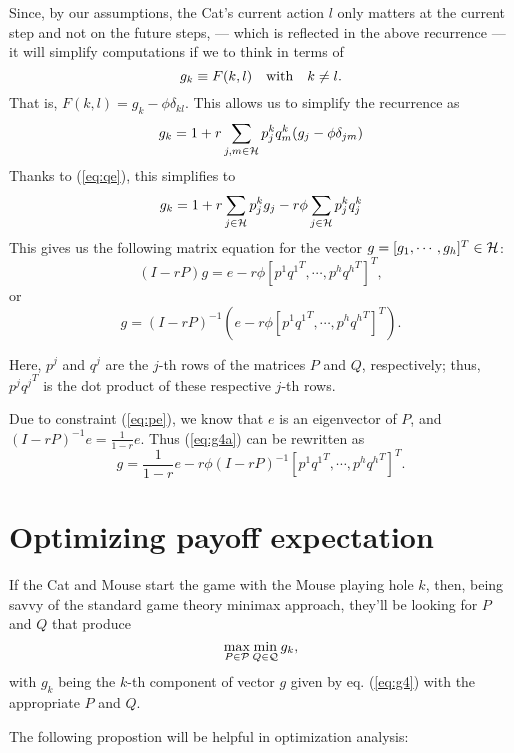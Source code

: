 \documentclass[12pt]{article}
\begin{document}
Since, by our assumptions, the Cat's current action $l$ only matters at the current step and not on the future steps, --- which is reflected in the above recurrence --- it will simplify computations if we to think in terms of 
$$
g_k \equiv F(k, l)  \quad {\rm with} \quad k\ne l.
$$
That is, $F(k,l) = g_k - \phi \delta_{kl}$.  This allows us to simplify the recurrence as
$$
g_k = 1  + r \sum_{j,m \in \cal{H}} p^k_j q^k_m  (g_j - \phi\delta_{jm})
$$
Thanks to (\ref{eq:qe}), this simplifies to
\begin{equation}
\label{eq:g2}
g_k = 1  + r \sum_{j\in \cal{H}} p^k_j g_j -  
r \phi \sum_{j\in \cal{H}}p^k_j q^k_j
\end{equation}
This gives us the following matrix equation for the vector
$g = [g_1, \cdots, g_h]^T \in \cal{H}$:
\begin{equation}
\label{eq:g3}
(I - rP) g = e - r \phi [ p^1 {q^1}^T, \cdots, p^h {q^h}^T]^T,
\end{equation}
or
\begin{equation}
\label{eq:g4a}
g = (I - rP)^{-1} ( e - r \phi [ p^1 {q^1}^T, \cdots, p^h {q^h}^T]^T ).
\end{equation}

Here, $p^j$ and $q^j$ are the $j$-th rows of the matrices $P$ and $Q$, respectively; thus, $p^j {q^j}^T$ is the dot product of these respective $j$-th rows.

Due to constraint (\ref{eq:pe}), we know that $e$ is an eigenvector of $P$,
and $(I - rP)^{-1} e  = \frac{1}{1-r} e$. Thus  (\ref{eq:g4a}) can be rewritten as
\begin{equation}
\label{eq:g4}
g = \frac{1}{1 - r} e - r \phi (I-rP)^{-1}  [ p^1 {q^1}^T, \cdots, p^h {q^h}^T]^T.
\end{equation}

\section{Optimizing payoff expectation}
If the Cat and Mouse start the game with the Mouse playing hole $k$, then, being savvy of the standard game theory minimax approach, they'll be looking for $P$ and $Q$ that produce
\begin{equation}
\label{eq:mm}
\max_{P\in\cal{P}} \min_{Q\in\cal{Q}} g_k,
\end{equation}
with $g_k$ being the $k$-th component of vector $g$ given by eq. (\ref{eq:g4}) with the appropriate $P$ and $Q$.

The following propostion will be helpful in optimization analysis:
\end{document}
